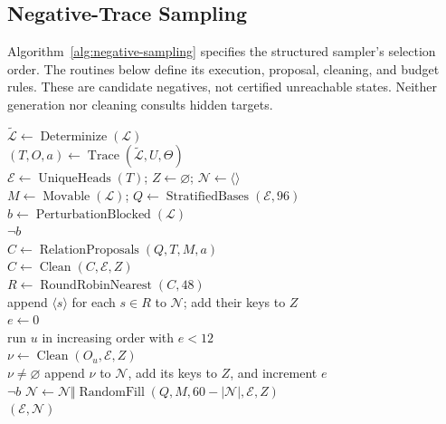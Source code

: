 \subsection{Negative-Trace Sampling}
\label{app:negative-sampling}



Algorithm~\ref{alg:negative-sampling} specifies the structured sampler's
selection order.  The routines below define its execution, proposal, cleaning,
and budget rules.  These are candidate negatives, not certified unreachable
states.  Neither generation nor cleaning consults hidden targets.

\begin{algorithm}[H]
\caption{Target-hidden candidate-negative sampling}
\label{alg:negative-sampling}
\begin{algorithmic}
\algline \(\widetilde{\mathcal L}\leftarrow\operatorname{Determinize}(\mathcal L)\)
  \\
\algline \((T,O,a)\leftarrow\operatorname{Trace}(\widetilde{\mathcal L},U,\Theta)\)
  \\
\algline \(\mathcal E\leftarrow\operatorname{UniqueHeads}(T)\);
  \(Z\leftarrow\varnothing\); \(\mathcal N\leftarrow\langle\rangle\)\\
\algline \(M\leftarrow\operatorname{Movable}(\mathcal L)\);
  \(Q\leftarrow\operatorname{StratifiedBases}(\mathcal E,96)\)\\
\algline \(b\leftarrow\operatorname{PerturbationBlocked}(\mathcal L)\)\\
\algline {} \(\neg b\) \\
\algline \algind \(C\leftarrow\operatorname{RelationProposals}(Q,T,M,a)\)\\
\algline \algind \(C\leftarrow\operatorname{Clean}(C,\mathcal E,Z)\)\\
\algline \algind \(R\leftarrow\operatorname{RoundRobinNearest}(C,48)\)\\
\algline \algind append \(\langle s\rangle\) for each \(s\in R\) to \(\mathcal N\);
  add their keys to \(Z\)\\
\algline \(e\leftarrow0\)\\
\algline {} run \(u\) in increasing order with \(e<12\) \\
\algline \algind \(\nu\leftarrow\operatorname{Clean}(O_u,\mathcal E,Z)\)\\
\algline \algind {} \(\nu\ne\varnothing\)  append \(\nu\) to \(\mathcal N\),
  add its keys to \(Z\), and increment \(e\)\\
\algline {} \(\neg b\) 
  \(\mathcal N\leftarrow\mathcal N\Vert
  \operatorname{RandomFill}(Q,M,60-|\mathcal N|,\mathcal E,Z)\)\\
\algline {} \((\mathcal E,\mathcal N)\)\\
\end{algorithmic}
\end{algorithm}

